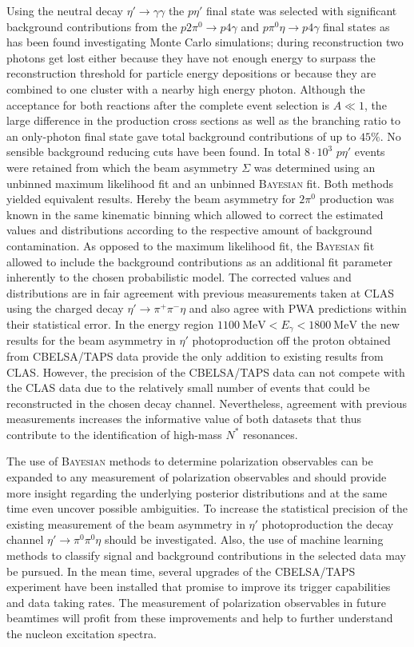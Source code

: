 Using the neutral decay $\eta'\to\gamma\gamma$ the $p\eta'$ final state was selected with significant background contributions from the $p2\pi^0\to p4\gamma$ and $p\pi^0\eta\to p4\gamma$ final states as has been found investigating Monte Carlo simulations; during reconstruction two photons get lost either because they have not enough energy to surpass the reconstruction threshold for particle energy depositions or because they are combined to one cluster with a nearby high energy photon. Although the acceptance for both reactions after the complete event selection is $A\ll1$, the large difference in the production cross sections as well as the branching ratio to an only-photon final state gave total background contributions of up to $45\%$. No sensible background reducing cuts have been found. In total $8\cdot10^3$ $p\eta'$ events were retained from which the beam asymmetry $\Sigma$ was determined using an unbinned maximum likelihood fit and an unbinned \textsc{Bayesian} fit. Both methods yielded equivalent results. Hereby the beam asymmetry for $2\pi^0$ production was known in the same kinematic binning which allowed to correct the estimated values and distributions according to the respective amount of background contamination. As opposed to the maximum likelihood fit, the \textsc{Bayesian} fit allowed to include the background contributions as an additional fit parameter inherently to the chosen probabilistic model. The corrected values and distributions are in fair agreement with previous measurements taken at CLAS using the charged decay $\eta'\to\pi^+\pi^-\eta$ and also agree with PWA predictions within their statistical error. In the energy region $\SI{1100}{\mega\eV}<E_\gamma<\SI{1800}{\mega\eV}$ the new results for the beam asymmetry in $\eta'$ photoproduction off the proton obtained from CBELSA/TAPS data provide the only addition to existing results from CLAS.  However, the precision of the CBELSA/TAPS data can not compete with the CLAS data due to the relatively small number of events that could be reconstructed in the chosen decay channel. Nevertheless, agreement with previous measurements increases the informative value of both datasets that thus contribute to the identification of high-mass $N^*$ resonances.  

The use of \textsc{Bayesian} methods to determine polarization observables can be expanded to any measurement of polarization observables and should provide more insight regarding the underlying posterior distributions and at the same time even uncover possible ambiguities. To increase the statistical precision of the existing measurement of the beam asymmetry in $\eta'$ photoproduction the decay channel $\eta'\to\pi^0\pi^0\eta$ should be investigated. Also, the use of machine learning methods to classify signal and background contributions in the selected data may be pursued. In the mean time, several upgrades of the CBELSA/TAPS experiment have been installed that promise to improve its trigger capabilities and data taking rates. The measurement of polarization observables in future beamtimes will profit from these improvements and help to further understand the nucleon excitation spectra.